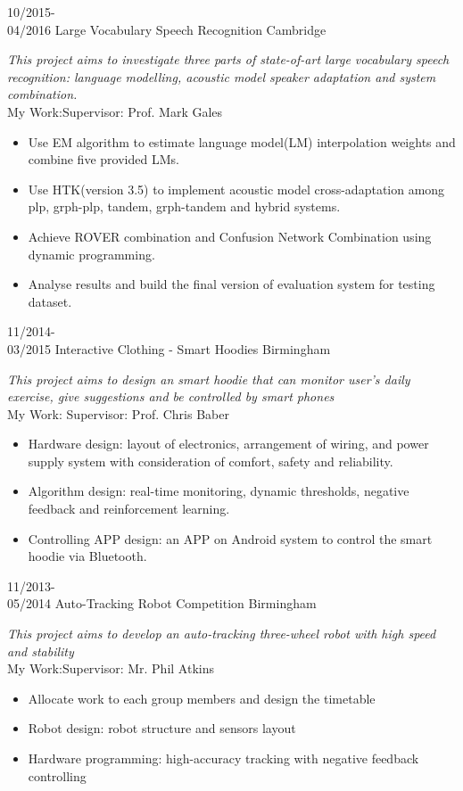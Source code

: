 \documentclass[]{friggeri-cv}
\begin{document}
\begin{entrylist}
\entry
    {10/2015-\\04/2016}
    {Large Vocabulary Speech Recognition}
    {Cambridge}
    {\emph{This project aims to investigate three parts of state-of-art large vocabulary speech recognition: language modelling, acoustic model speaker adaptation and system combination.}\\
    \textsf{My Work:}\hfill{\footnotesize{}Supervisor: Prof. Mark Gales}
    \begin{itemize}
    \item Use EM algorithm to estimate language model(LM) interpolation weights and combine five provided LMs.
    \item Use HTK(version 3.5) to implement acoustic model cross-adaptation among plp, grph-plp, tandem, grph-tandem and hybrid systems. 
    \item Achieve ROVER combination and Confusion Network Combination using dynamic programming. 
    \item Analyse results and build the final version of evaluation system for testing dataset.
\end{itemize}
}   
  \entry
	{11/2014-\\03/2015}
    {Interactive Clothing - Smart Hoodies}
    {Birmingham}
    {\emph{This project aims to design an smart hoodie that can monitor user's daily exercise, give suggestions and be controlled by smart phones}\\
    \textsf{My Work:}\hfill{\footnotesize{} Supervisor: Prof. Chris Baber}
    \begin{itemize}
    \item Hardware design: layout of electronics, arrangement of wiring, and power supply system with consideration of comfort, safety and reliability.
    \item Algorithm design: real-time monitoring, dynamic thresholds, negative feedback and reinforcement learning.
    \item Controlling APP design: an APP on Android system to control the smart hoodie via Bluetooth.
	\end{itemize}
	}
	
  \entry
    {11/2013-\\05/2014}
    {Auto-Tracking Robot Competition}
    {Birmingham}
    {\emph{This project aims to develop an auto-tracking three-wheel robot with high speed and stability}\\
    \textsf{My Work:}\hfill{\footnotesize{}Supervisor: Mr. Phil Atkins}
    \begin{itemize}
    \item Allocate work to each group members and design the timetable
    \item Robot design: robot structure and sensors layout
    \item Hardware programming: high-accuracy tracking with negative feedback controlling
    \end{itemize}
}

\end{entrylist}
\end{document}
